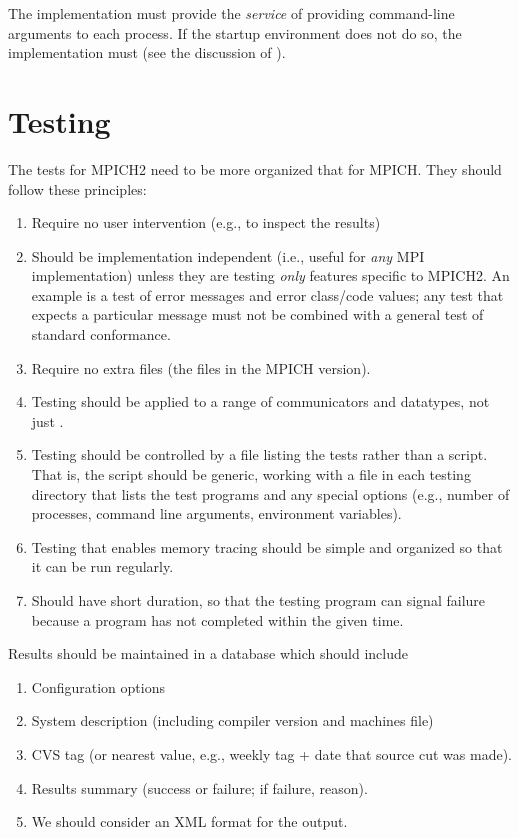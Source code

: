 \documentclass{article}
\begin{document}
The implementation must provide the \emph{service} of providing
command-line arguments to each process.  If the startup environment
does not do so, the implementation must (see the discussion of
).  

\section{Testing}
\label{sec:testing}

The tests for MPICH2 need to be more organized that for MPICH. They
should follow these principles:
\begin{enumerate}
\item Require no user intervention (e.g., to inspect the results)
\item Should be implementation independent (i.e., useful for
\emph{any} MPI implementation) unless they are testing \emph{only}
features specific to MPICH2.  An example is a test of error messages
and error class/code values; any test that expects a particular
message must not be combined with a general test of standard
conformance.
\item Require no extra files (the  files in the MPICH
version).
\item Testing should be applied to a range of communicators and
datatypes, not just .  
\item Testing should be controlled by a file listing the tests rather
than a script.  That is, the script  should be generic,
working with a file in each testing directory that lists the test
programs and any special options (e.g., number of processes, command
line arguments, environment variables).
\item Testing that enables memory tracing should be simple and
organized so that it can be run regularly.
\item Should have short duration, so that the testing program can
signal failure because a program has not completed within the given
time.
\end{enumerate}

Results should be maintained in a database which should include
\begin{enumerate}
\item Configuration options
\item System description (including compiler version and machines file)
\item CVS tag (or nearest value, e.g., weekly tag + date that source
cut was made).
\item Results summary (success or failure; if failure, reason).
\item We should consider an XML format for the output.
\end{enumerate}
\end{document}
